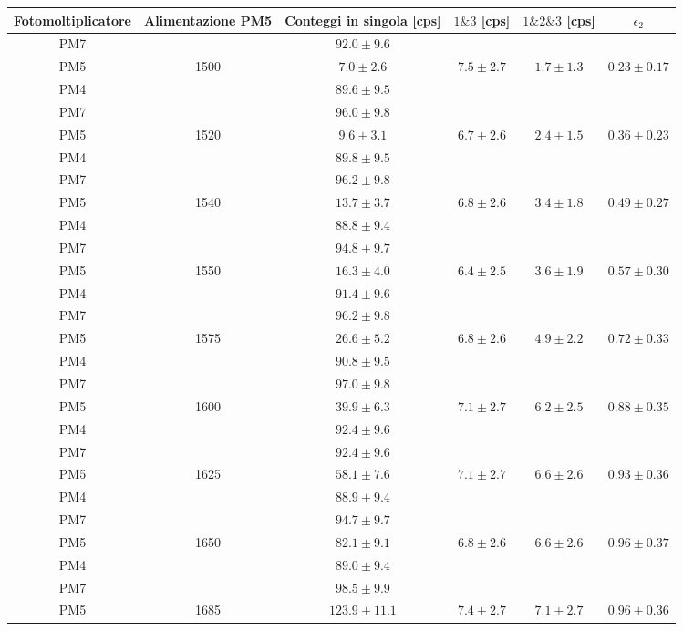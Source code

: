 \documentclass{article}
\begin{document}
\begin{table}[H]
\centering
\begin{tabular}{|c|c|c|c|c|c|}
\hline
Fotomoltiplicatore & Alimentazione PM5 & Conteggi in singola [cps] & $1 \& 3$  [cps]&  $1\&2\& 3$ [cps]& $\epsilon_2$\\ 
 \hline
\hline 
PM7 & & $92.0 \pm 9.6$ & & & \\ 
PM5 & 1500 & $7.0 \pm 2.6$& $7.5 \pm 2.7$  & $1.7 \pm 1.3$ & $0.23 \pm 0.17$\\ 
PM4 & & $89.6 \pm 9.5$ & & & \\ 
\hline 
PM7 & & $96.0 \pm 9.8$ & & & \\ 
PM5 & 1520 & $9.6 \pm 3.1$& $6.7 \pm 2.6$  & $2.4 \pm 1.5$ & $0.36 \pm 0.23$\\ 
PM4 & & $89.8 \pm 9.5$ & & & \\ 
\hline 
PM7 & & $96.2 \pm 9.8$ & & & \\ 
PM5 & 1540 & $13.7 \pm 3.7$& $6.8 \pm 2.6$  & $3.4 \pm 1.8$ & $0.49 \pm 0.27$\\ 
PM4 & & $88.8 \pm 9.4$ & & & \\ 
\hline 
PM7 & & $94.8 \pm 9.7$ & & & \\ 
PM5 & 1550 & $16.3 \pm 4.0$& $6.4 \pm 2.5$  & $3.6 \pm 1.9$ & $0.57 \pm 0.30$\\ 
PM4 & & $91.4 \pm 9.6$ & & & \\ 
\hline 
PM7 & & $96.2 \pm 9.8$ & & & \\ 
PM5 & 1575 & $26.6 \pm 5.2$& $6.8 \pm 2.6$  & $4.9 \pm 2.2$ & $0.72 \pm 0.33$\\ 
PM4 & & $90.8 \pm 9.5$ & & & \\ 
\hline 
PM7 & & $97.0 \pm 9.8$ & & & \\ 
PM5 & 1600 & $39.9 \pm 6.3$& $7.1 \pm 2.7$  & $6.2 \pm 2.5$ & $0.88 \pm 0.35$\\ 
PM4 & & $92.4 \pm 9.6$ & & & \\ 
\hline 
PM7 & & $92.4 \pm 9.6$ & & & \\ 
PM5 & 1625 & $58.1 \pm 7.6$& $7.1 \pm 2.7$  & $6.6 \pm 2.6$ & $0.93 \pm 0.36$\\ 
PM4 & & $88.9 \pm 9.4$ & & & \\ 
\hline 
PM7 & & $94.7 \pm 9.7$ & & & \\ 
PM5 & 1650 & $82.1 \pm 9.1$& $6.8 \pm 2.6$  & $6.6 \pm 2.6$ & $0.96 \pm 0.37$\\ 
PM4 & & $89.0 \pm 9.4$ & & & \\ 
\hline 
PM7 & & $98.5 \pm 9.9$ & & & \\ 
PM5 & 1685 & $123.9 \pm 11.1$& $7.4 \pm 2.7$  & $7.1 \pm 2.7$ & $0.96 \pm 0.36$\\ 

\end{tabular}
\end{table}
\end{document}
